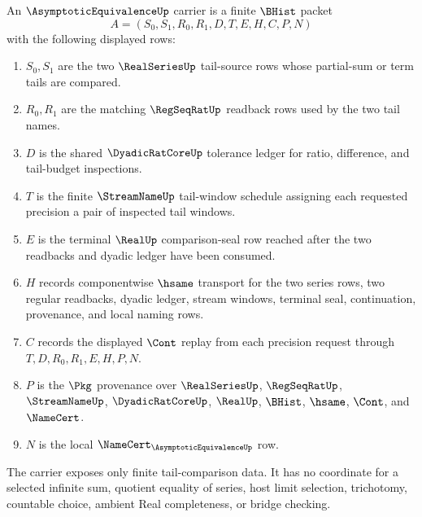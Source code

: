 \begin{definition}
\label{def:asymptotic-equivalence-carrier}
An $\AsymptoticEquivalenceUp$ carrier is a finite $\BHist$ packet
$$
A=(S_0,S_1,R_0,R_1,D,T,E,H,C,P,N)
$$
with the following displayed rows:
\begin{enumerate}
\item $S_0,S_1$ are the two $\RealSeriesUp$ tail-source rows whose partial-sum or term tails are compared.
\item $R_0,R_1$ are the matching $\RegSeqRatUp$ readback rows used by the two tail names.
\item $D$ is the shared $\DyadicRatCoreUp$ tolerance ledger for ratio, difference, and tail-budget inspections.
\item $T$ is the finite $\StreamNameUp$ tail-window schedule assigning each requested precision a pair of inspected tail windows.
\item $E$ is the terminal $\RealUp$ comparison-seal row reached after the two readbacks and dyadic ledger have been consumed.
\item $H$ records componentwise $\hsame$ transport for the two series rows, two regular readbacks, dyadic ledger, stream windows, terminal seal, continuation, provenance, and local naming rows.
\item $C$ records the displayed $\Cont$ replay from each precision request through $T,D,R_0,R_1,E,H,P,N$.
\item $P$ is the $\Pkg$ provenance over $\RealSeriesUp$, $\RegSeqRatUp$, $\StreamNameUp$, $\DyadicRatCoreUp$, $\RealUp$, $\BHist$, $\hsame$, $\Cont$, and $\NameCert$.
\item $N$ is the local $\NameCert_{\AsymptoticEquivalenceUp}$ row.
\end{enumerate}
The carrier exposes only finite tail-comparison data. It has no coordinate for a selected infinite sum, quotient equality of series, host limit selection, trichotomy, countable choice, ambient Real completeness, or bridge checking.
\end{definition}

